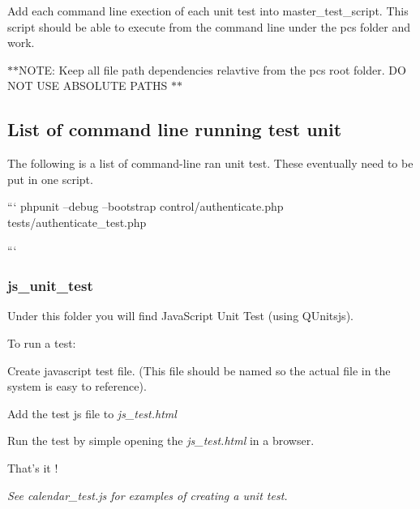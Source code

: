 Add each command line exection of each unit test into master\-\_\-test\-\_\-script. This script should be able to execute from the command line under the pcs folder and work.

$\ast$$\ast$\-N\-O\-T\-E\-: Keep all file path dependencies relavtive from the pcs root folder. D\-O N\-O\-T U\-S\-E A\-B\-S\-O\-L\-U\-T\-E P\-A\-T\-H\-S $\ast$$\ast$

\subsection*{List of command line running test unit}

The following is a list of command-\/line ran unit test. These eventually need to be put in one script.

``` phpunit --debug --bootstrap control/authenticate.\-php tests/authenticate\-\_\-test.\-php

``` 



\subsubsection*{js\-\_\-unit\-\_\-test}

Under this folder you will find Java\-Script Unit Test (using Q\-Unitsjs).

To run a test\-:


\begin{DoxyEnumerate}
\item Create javascript test file. (This file should be named so the actual file in the system is easy to reference).
\item Add the test js file to {\itshape js\-\_\-test.\-html}
\item Run the test by simple opening the {\itshape js\-\_\-test.\-html} in a browser.
\end{DoxyEnumerate}

That's it !

{\itshape See calendar\-\_\-test.\-js for examples of creating a unit test.} 